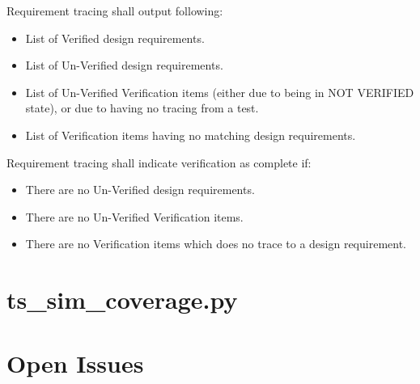 \documentclass{tropic_design_spec}
\begin{document}
    {Requirement tracing shall output following:
     \begin{itemize}
        \item{List of Verified design requirements.}
        \item{List of Un-Verified design requirements.}
        \item{List of Un-Verified Verification items (either due to being in NOT VERIFIED state),
              or due to having no tracing from a test.}
        \item{List of Verification items having no matching design requirements.}
     \end{itemize}
    }

    {Requirement tracing shall indicate verification as complete if:
     \begin{itemize}
        \item{There are no Un-Verified design requirements.}
        \item{There are no Un-Verified Verification items.}
        \item{There are no Verification items which does no trace to a design requirement.}
     \end{itemize}
    }


\ReqEnd



\pagebreak

\section{ts_sim_coverage.py}



\pagebreak
\section{Open Issues}

\PrintOpenIssueSummary
\end{document}
